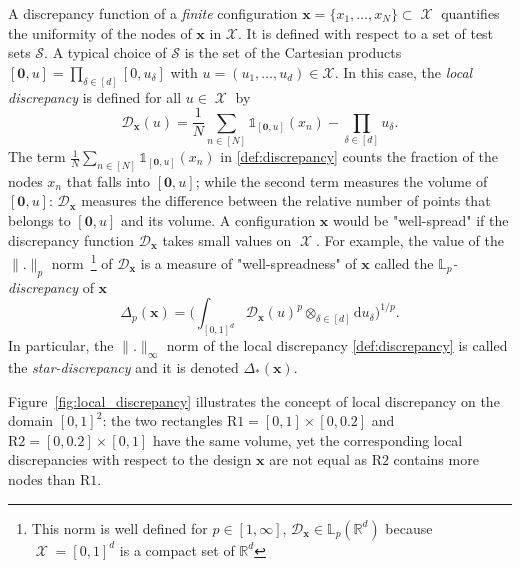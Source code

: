 \documentclass[twoside,11pt]{book}
\numberwithin{theorem}{chapter}
\numberwithin{definition}{chapter}
\numberwithin{proposition}{chapter}
\numberwithin{corollary}{chapter}
\numberwithin{example}{chapter}
\numberwithin{lemma}{chapter}
\numberwithin{assumption}{chapter}
\DeclareMathOperator{\X}{\mathcal{X}}
\begin{document}
 A discrepancy function of a \emph{finite} configuration $\bm{x} = \{x_{1}, \dots, x_{N} \} \subset \X$ quantifies the uniformity of the nodes of $\bm{x}$ in $\mathcal{X}$. It is  defined with respect to a set of test sets $\mathcal{S}$. A typical choice of $\mathcal{S}$ is the set of the Cartesian products $[\bm{0},u] = \prod_{\delta \in [d]}[0,u_{\delta}]$ with $u = (u_{1}, \dots, u_{d}) \in \mathcal{X}$. In this case, the \emph{local discrepancy} is defined for all $u \in \X$ by 
\begin{equation}\label{def:discrepancy}
\mathcal{D}_{\bm{x}}(u) = \frac{1}{N}\sum\limits_{n \in [N]} \mathbb{1}_{[\bm{0},u]}(x_{n}) - \prod\limits_{\delta \in [d]}u_{\delta}.
\end{equation}  
The term $\frac{1}{N}\sum_{n \in [N]} \mathbb{1}_{[\bm{0},u]}(x_{n})$ in \eqref{def:discrepancy} counts the fraction of the nodes $x_{n}$ that falls into $[\bm{0},u]$; while the second term measures the volume of $[\bm{0},u]$: $\mathcal{D}_{\bm{x}}$ measures the difference between the relative number of points that belongs to $[\bm{0},u]$ and its volume. A configuration $\bm{x}$ would be "well-spread" if the discrepancy function $\mathcal{D}_{\bm{x}}$ takes small values on $\X$. For example, the value of the $\|.\|_{p}$ norm~\footnote{This norm is well defined for $p \in [1,\infty]$, $\mathcal{D}_{\bm{x}} \in \mathbb{L}_{p}(\mathbb{R}^{d})$ because $\X = [0,1]^{d}$ is a compact set of $\mathbb{R}^{d}$} of $\mathcal{D}_{\bm{x}}$ is a measure of "well-spreadness" of $\bm{x}$ called the \emph{$\mathbb{L}_{p}$-discrepancy} of $\bm{x}$
\begin{equation}
\Delta_{p}(\bm{x}) = \bigg(\int_{[0,1]^{d}}\mathcal{D}_{\bm{x}}(u)^{p} \otimes_{\delta \in [d]} \mathrm{d}u_{\delta}\bigg)^{1/p}.
\end{equation}
In particular, the $\|.\|_{\infty}$ norm of the local discrepancy \eqref{def:discrepancy} is called the \emph{star-discrepancy} and it is denoted $\Delta_{*}(\bm{x})$.

Figure~\ref{fig:local_discrepancy} illustrates the concept of local discrepancy on the domain $[0,1]^{2}$: the two rectangles $\mathrm{R1} = [0,1] \times [0,0.2]$ and $\mathrm{R2} = [0,0.2] \times [0,1]$ have the same volume, yet the corresponding local discrepancies with respect to the design $\bm{x}$ are not equal as $\mathrm{R2}$ contains more nodes than $\mathrm{R1}$.


\end{document}
